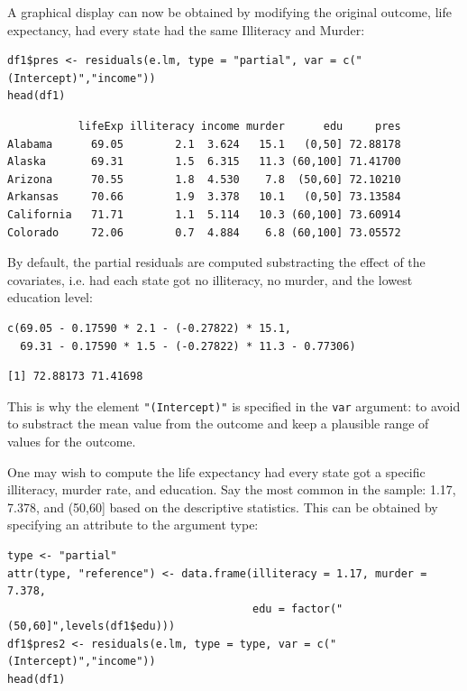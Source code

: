 \documentclass[12pt]{article}
\begin{document}
A graphical display can now be obtained by modifying the original
outcome, life expectancy, had every state had the same Illiteracy and
Murder:
\lstset{language=r,label= ,caption= ,captionpos=b,numbers=none}
\begin{lstlisting}
df1$pres <- residuals(e.lm, type = "partial", var = c("(Intercept)","income"))
head(df1)
\end{lstlisting}

\begin{verbatim}
           lifeExp illiteracy income murder      edu     pres
Alabama      69.05        2.1  3.624   15.1   (0,50] 72.88178
Alaska       69.31        1.5  6.315   11.3 (60,100] 71.41700
Arizona      70.55        1.8  4.530    7.8  (50,60] 72.10210
Arkansas     70.66        1.9  3.378   10.1   (0,50] 73.13584
California   71.71        1.1  5.114   10.3 (60,100] 73.60914
Colorado     72.06        0.7  4.884    6.8 (60,100] 73.05572
\end{verbatim}


By default, the partial residuals are computed substracting the effect
of the covariates, i.e. had each state got no illiteracy, no murder,
and the lowest education level:
\lstset{language=r,label= ,caption= ,captionpos=b,numbers=none}
\begin{lstlisting}
c(69.05 - 0.17590 * 2.1 - (-0.27822) * 15.1,
  69.31 - 0.17590 * 1.5 - (-0.27822) * 11.3 - 0.77306)
\end{lstlisting}

\begin{verbatim}
[1] 72.88173 71.41698
\end{verbatim}


This is why the element \texttt{"(Intercept)"} is specified in the \texttt{var}
argument: to avoid to substract the mean value from the outcome and
keep a plausible range of values for the outcome.

\bigskip

One may wish to compute the life expectancy had every state got a
specific illiteracy, murder rate, and education. Say the most common
in the sample: 1.17, 7.378, and (50,60] based on the descriptive
statistics. This can be obtained by specifying an attribute to the
argument type:
\lstset{language=r,label= ,caption= ,captionpos=b,numbers=none}
\begin{lstlisting}
type <- "partial"
attr(type, "reference") <- data.frame(illiteracy = 1.17, murder = 7.378,
                                      edu = factor("(50,60]",levels(df1$edu)))
df1$pres2 <- residuals(e.lm, type = type, var = c("(Intercept)","income"))
head(df1)
\end{lstlisting}
\end{document}
